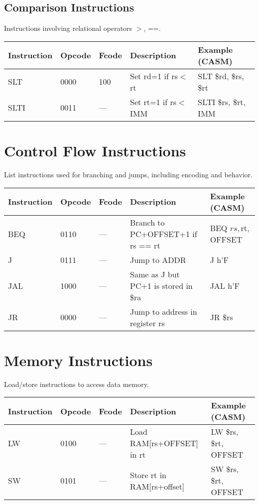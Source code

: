 \documentclass[a4paper,11pt]{article}
\begin{document}
	\subsection*{Comparison Instructions}
	Instructions involving relational operators $>$, ==.
	\begin{longtable}{|l|l|l|p{6cm}|l|}
		\hline
		\textbf{Instruction} & \textbf{Opcode} & \textbf{Fcode} & \textbf{Description} & \textbf{Example (CASM)} \\
		\hline
		SLT                  & 0000         & 100            & Set rd=1 if rs$<$rt & SLT \$rd, \$rs, \$rt\\
		\hline
		SLTI                   & 0011         & ---            & Set rt=1 if rs$<$IMM & SLTI \$rs, \$rt, IMM\\
		\hline
	\end{longtable}
	
	
	\section*{Control Flow Instructions}
	List instructions used for branching and jumps, including encoding and behavior.
	
	\begin{longtable}{|l|l|l|p{6cm}|l|}
		\hline
		\textbf{Instruction} & \textbf{Opcode} & \textbf{Fcode} & \textbf{Description} & \textbf{Example (CASM)} \\
		\hline
		BEQ                  & 0110         & ---            & Branch to PC+OFFSET+1 if rs == rt  & BEQ $rs, $rt, OFFSET\\
		\hline
		J                  & 0111         & ---            & Jump to ADDR & J h'F\\
		\hline
		JAL                  & 1000         & ---              & Same as J but PC+1 is stored in \$ra  & JAL h'F\\
		\hline
		JR                  & 0000         & ---              & Jump to address in register rs & JR \$rs\\
		\hline
	\end{longtable}
	
	\section*{Memory Instructions}
	Load/store instructions to access data memory.
	
	\begin{longtable}{|l|l|l|p{6cm}|l|}
		\hline
		\textbf{Instruction} & \textbf{Opcode} & \textbf{Fcode} & \textbf{Description} & \textbf{Example (CASM)}\\
		\hline
		LW                   & 0100         & ---            & Load RAM[rs+OFFSET] in rt & LW \$rs, \$rt, OFFSET\\
		\hline
		SW                   & 0101         & ---            & Store rt in RAM[rs+offset] & SW \$rs, \$rt, OFFSET\\
		\hline
	\end{longtable}
	
\end{document}
